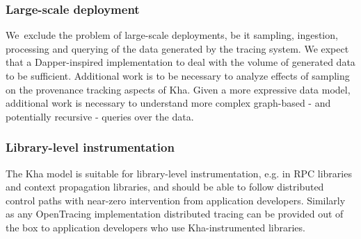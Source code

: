 \subsubsection*{Large-scale deployment}
We\ exclude the problem of large-scale deployments, be it sampling, ingestion, processing and querying of the data generated by the tracing system. We expect that a Dapper-inspired implementation to deal with the volume of generated data to be sufficient. Additional work is to be necessary to analyze effects of sampling on the provenance tracking aspects of Kha. Given a more expressive data model, additional work is necessary to understand  more complex graph-based - and potentially recursive - queries over the data.
\par

\subsubsection*{Library-level instrumentation}
The Kha model is suitable for library-level instrumentation, e.g. in RPC libraries and context propagation libraries, and should be able to follow distributed control paths with near-zero intervention from application developers. Similarly as any OpenTracing implementation distributed tracing can be provided out of the box to application developers who use Kha-instrumented libraries.
\par


\begin{comment}


\begin{figure}[h]
    \label{fig:tradycyjne-logo-pw}
    \centering \texttt{[image: logopw.png]}
    \caption{Tradycyjne godło Politechniki Warszawskiej}
\end{figure}
\lipsum[2-3]
\begin{figure}[!h]
	\label{fig:nowe-logo-pw}
	\centering \texttt{[image: logopw2.png]}
	\caption{Współczesne logo Politechniki Warszawskiej}
\end{figure}
\lipsum[4-6]


\end{comment}